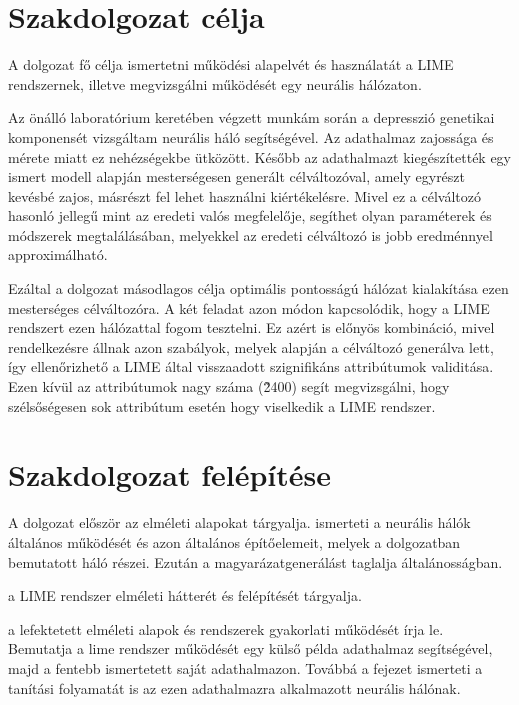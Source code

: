 \section{Szakdolgozat célja}

A dolgozat fő célja ismertetni működési alapelvét és használatát a LIME rendszernek, illetve megvizsgálni működését egy neurális hálózaton.

Az önálló laboratórium keretében végzett munkám során a depresszió genetikai komponensét vizsgáltam neurális háló segítségével. Az adathalmaz zajossága és mérete miatt ez nehézségekbe ütközött. Később az adathalmazt kiegészítették egy ismert modell alapján mesterségesen generált célváltozóval, amely egyrészt kevésbé zajos, másrészt fel lehet használni kiértékelésre. Mivel ez a célváltozó hasonló jellegű mint az eredeti valós megfelelője, segíthet olyan paraméterek és módszerek megtalálásában, melyekkel az eredeti célváltozó is jobb eredménnyel approximálható.

Ezáltal a dolgozat másodlagos célja optimális pontosságú hálózat kialakítása ezen mesterséges célváltozóra. A két feladat azon módon kapcsolódik, hogy a LIME rendszert ezen hálózattal fogom tesztelni. Ez azért is előnyös kombináció, mivel rendelkezésre állnak azon szabályok, melyek alapján a célváltozó generálva lett, így ellenőrizhető a LIME által visszaadott szignifikáns attribútumok validitása. Ezen kívül az attribútumok nagy száma (\~2400) segít megvizsgálni, hogy szélsőségesen sok attribútum esetén hogy viselkedik a LIME rendszer.

\section{Szakdolgozat felépítése}

A dolgozat először az elméleti alapokat tárgyalja.  ismerteti a neurális hálók általános működését és azon általános építőelemeit, melyek a dolgozatban bemutatott háló részei. Ezután  a magyarázatgenerálást taglalja általánosságban. 

 a LIME rendszer elméleti hátterét és felépítését tárgyalja.

 a lefektetett elméleti alapok és rendszerek gyakorlati működését írja le. Bemutatja a lime rendszer működését egy külső példa adathalmaz segítségével, majd a fentebb ismertetett saját adathalmazon. Továbbá a fejezet ismerteti a tanítási folyamatát is az ezen adathalmazra alkalmazott neurális hálónak.




